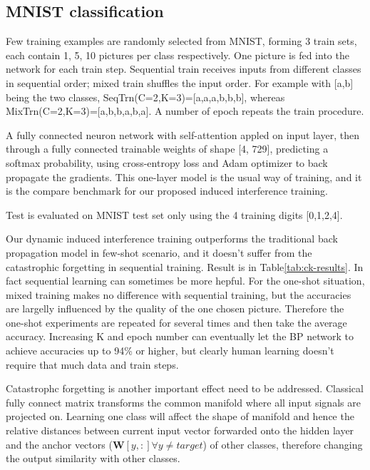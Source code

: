 \documentclass[11pt,a4paper]{article}
\begin{document}
\begin{multicols}{2}
  \subsection{MNIST classification}

  Few training examples are randomly selected from MNIST, forming 3 train sets, each contain 1, 5, 10 pictures per class respectively. 
  One picture is fed into the network for each train step. Sequential train receives inputs from different classes in sequential order; mixed train shuffles the input order. 
  For example with [a,b] being the two classes, SeqTrn(C=2,K=3)=[a,a,a,b,b,b], whereas MixTrn(C=2,K=3)=[a,b,b,a,b,a]. 
  A number of epoch repeats the train procedure. 

  A fully connected neuron network with self-attention appled on input layer, then through a fully connected trainable weights of shape [4, 729], 
  predicting a softmax probability, using cross-entropy loss and Adam optimizer to back propagate the gradients. This one-layer model is the usual way of training, 
  and it is the compare benchmark for our proposed induced interference training.

  Test is evaluated on MNIST test set only using the 4 training digits [0,1,2,4]. 


  Our dynamic induced interference training outperforms the traditional back propagation model in few-shot scenario, 
  and it doesn't suffer from the catastrophic forgetting in sequential training. Result is in Table\ref{tab:ck-results}. In fact sequential learning can sometimes be more hepful. 
  For the one-shot situation, mixed training makes no difference with sequential training, but the accuracies are largelly influenced by the quality of the one chosen picture. 
  Therefore the one-shot experiments are repeated for several times and then take the average accuracy. 
  Increasing K and epoch number can eventually let the BP network to achieve accuracies up to 94\% or higher, but clearly human learning doesn't require that much data and train steps. 
  
  Catastrophc forgetting is another important effect need to be addressed. Classical fully connect matrix transforms the common manifold where all input signals are projected on. 
  Learning one class will affect the shape of manifold and hence the relative distances between current input vector forwarded onto the hidden layer and the anchor vectors ($\boldsymbol{W}[y,:] \forall y \neq target$) of other classes, 
  therefore changing the output similarity with other classes. 


\end{multicols}
\end{document}
